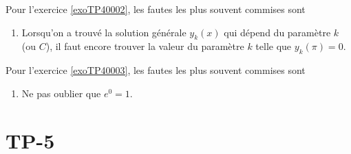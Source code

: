 Pour l'exercice \ref{exoTP40002}, les fautes les plus souvent commises sont
\begin{enumerate}

	\item
		Lorsqu'on a trouvé la solution générale $y_k(x)$ qui dépend du paramètre $k$ (ou $C$), il faut encore trouver la valeur du paramètre $k$ telle que $y_k(\pi)=0$.

\end{enumerate}


Pour l'exercice \ref{exoTP40003}, les fautes les plus souvent commises sont
\begin{enumerate}

	\item
		Ne pas oublier que $e^0=1$.

\end{enumerate}


\section{TP-5}
\setcounter{exercice}{0}

